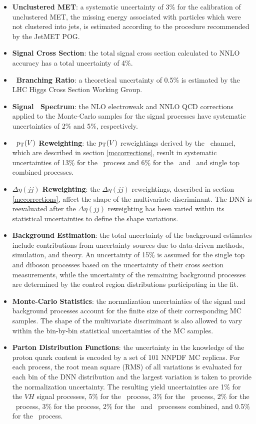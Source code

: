 \begin{itemize}
  \item \textbf{Unclustered MET}: a systematic uncertainty of 3\% for the calibration of unclustered MET, the missing energy associated with particles which were not clustered into jets, is estimated according to the procedure recommended by the JetMET POG.
  \item \textbf{Signal Cross Section}: the total signal cross section calculated to NNLO accuracy has a total uncertainty of 4\%.\cite{CERNYR1}
  \item \textbf{\Htobb\ Branching Ratio}: a theoretical uncertainty of 0.5\% is estimated by the LHC Higgs Cross Section Working Group.\cite{CERNYR4}
  \item \textbf{Signal \pT\ Spectrum}: the NLO electroweak\cite{UNCEWKCORR1,UNCEWKCORR2,UNCEWKCORR3} and NNLO QCD corrections\cite{UNCQCDCORR} applied to the Monte-Carlo samples for the signal processes have systematic uncertainties of 2\% and 5\%, respectively.
  \item \textbf{\WlnH\ $p_{\mathrm{T}}(V)$ Reweighting}: the $p_{\mathrm{T}}(V)$ reweightings derived by the \WlnH\ channel, which are described in section \ref{mccorrections}, result in systematic uncertainties of 13\% for the \qrkt\qrktbar\ process and 6\% for the \Wlight\ and \Wbb\ and single top combined processes.
  \item \textbf{$\Delta\eta(jj)$ Reweighting}: the $\Delta\eta(jj)$ reweightings, described in section \ref{mccorrections}, affect the shape of the multivariate discriminant. The DNN is reevaluated after the $\Delta\eta(jj)$ reweighting has been varied within its statistical uncertainties to define the shape variations.
  \item \textbf{Background Estimation}: the total uncertainty of the background estimates include contributions from uncertainty sources due to data-driven methods, simulation, and theory. An uncertainty of 15\% is assumed for the single top and diboson processes based on the uncertainty of their cross section measurements, while the uncertainty of the remaining background processes are determined by the control region distributions participating in the fit.
  \item \textbf{Monte-Carlo Statistics}: the normalization uncertainties of the signal and background processes account for the finite size of their corresponding MC samples. The shape of the multivariate discriminant is also allowed to vary within the bin-by-bin statistical uncertainties of the MC samples.
  \item \textbf{Parton Distribution Functions}: the uncertainty in the knowledge of the proton quark content is encoded by a set of 101 NNPDF MC replicas. For each process, the root mean square (RMS) of all variations is evaluated for each bin of the DNN distribution and the largest variation is taken to provide the normalization uncertainty. The resulting yield uncertainties are 1\% for the $VH$ signal processes, 5\% for the \Vlight\ process, 3\% for the \Vb\ process, 2\% for the \Vbb\ process, 3\% for the \bosV\Vlight process, 2\% for the \bosV\Vb\ and \bosV\Vbb\ processes combined, and 0.5\% for the \qrkt\qrktbar\ process.

\end{itemize}
